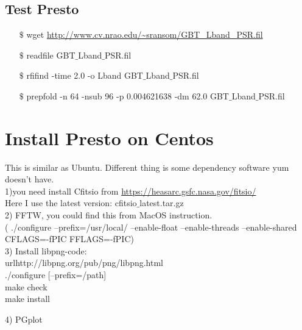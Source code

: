 \documentclass{article}
\begin{document}
\subsection{Test Presto}
\begin{itemize}
\item[$\$$] wget  \url{http://www.cv.nrao.edu/~sransom/GBT_Lband_PSR.fil} \\
\item[$\$$] readfile GBT$\_$Lband$\_$PSR.fil \\
\item[$\$$] rfifind -time 2.0 -o Lband GBT$\_$Lband$\_$PSR.fil \\
\item[$\$$] prepfold -n 64 -nsub 96 -p 0.004621638 -dm 62.0 GBT$\_$Lband$\_$PSR.fil
\end{itemize}

\section{Install Presto on Centos}
This is similar as Ubuntu. Different thing is some dependency software yum doesn't have.\\

1)you need install Cfitsio from \url{https://heasarc.gsfc.nasa.gov/fitsio/} \\
Here I use the latest version: cfitsio$\_$latest.tar.gz \\

2) FFTW, you could find this from MacOS instruction. \\
( ./configure --prefix=/usr/local/ --enable-float --enable-threads --enable-shared CFLAGS=-fPIC FFLAGS=-fPIC) \\

3) Install libpng-code: \\
	url{http://libpng.org/pub/png/libpng.html}\\
    ./configure [--prefix=/path] \\

    make check \\

    make install

4) PGplot  \\
\end{document}
